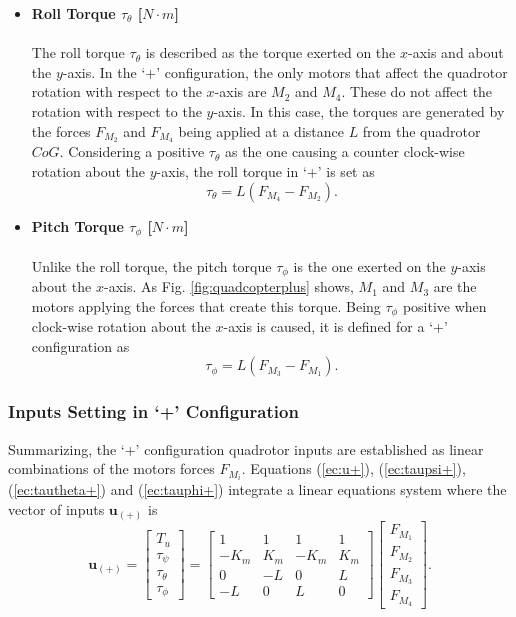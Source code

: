 \begin{itemize}
\item \textbf{Roll Torque $\tau_{\theta}$ [$N\cdot m$]}\\\\
The roll torque $\tau_\theta$ is described as the torque exerted on the $x$-axis and about the $y$-axis. In the `+' configuration, the only motors that affect the quadrotor rotation with respect to the $x$-axis are $M_2$ and $M_4$. These do not affect the rotation with respect to the $y$-axis. In this case, the torques are generated by the forces $F_{M_2}$ and $F_{M_4}$ being applied at a distance $L$ from the quadrotor $CoG$. Considering a positive $\tau_\theta$ as the one causing a counter clock-wise rotation about the $y$-axis, the roll torque in `+' is set as
\begin{equation}
\label{ec:tautheta+}
\tau_{\theta} = L(F_{M_4}-F_{M_2}).
\end{equation}

\item \textbf{Pitch Torque $\tau_{\phi}$ [$N\cdot m$]}\\\\
Unlike the roll torque, the pitch torque $\tau_\phi$ is the one exerted on the $y$-axis about the $x$-axis. As Fig. \ref{fig:quadcopterplus} shows, $M_1$ and $M_3$ are the motors applying the forces that create this torque. Being $\tau_\phi$ positive when clock-wise rotation about the $x$-axis is caused, it is defined for a `+' configuration as
\begin{equation}
\label{ec:tauphi+}
\tau_{\phi} = L(F_{M_3}-F_{M_1}).
\end{equation}
\end{itemize}

\subsubsection{Inputs Setting in `+' Configuration}
Summarizing, the `+' configuration quadrotor inputs are established as linear combinations of the motors forces $F_{M_i}$. Equations (\ref{ec:u+}), (\ref{ec:taupsi+}), (\ref{ec:tautheta+}) and (\ref{ec:tauphi+}) integrate a linear equations system where the vector of inputs $\mathbf{u_{(+)}}$ is
\begin{equation}
	\mathbf{u_{(+)}} = \begin{bmatrix}
	T_u\\[5pt]
	\tau_{\psi}\\[5pt]
	\tau_{\theta}\\[5pt]
	\tau_{\phi}
	\end{bmatrix} = \begin{bmatrix}
	1 & 1 & 1 & 1 \\[5pt]
	-K_{m} & K_{m} & -K_{m} & K_{m}\\[5pt]
	0 & -L & 0 & L\\[5pt]
	-L & 0 & L & 0
							\end{bmatrix}
\begin{bmatrix}
F_{M_1}\\[5pt]
F_{M_2}\\[5pt]
F_{M_3}\\[5pt]
F_{M_4}
\end{bmatrix}.
	\label{ec:U_+}						
\end{equation}

